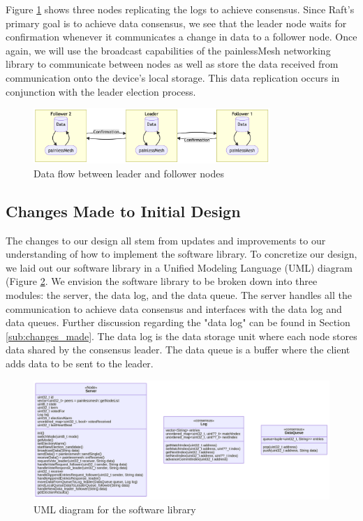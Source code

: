 Figure \ref{fig:data_flow} shows three nodes replicating the logs to achieve consensus. Since Raft's primary goal is to achieve data consensus, we see that the leader node waits for confirmation whenever it communicates a change in data to a follower node. Once again, we will use the broadcast capabilities of the painlessMesh networking library to communicate between nodes as well as store the data received from communication onto the device's local storage. This data replication occurs in conjunction with the leader election process.

\begin{figure}[H]
    \centering
    \includegraphics[width=0.8\textwidth]{images/final_design_data.png}
    \caption{Data flow between leader and follower nodes}
    \label{fig:data_flow}
\end{figure}

\subsection{Changes Made to Initial Design}

The changes to our design all stem from updates and improvements to our understanding of how to implement the software library. To concretize our design, we laid out our software library in a Unified Modeling Language (UML) diagram (Figure \ref{fig:uml}. We envision the software library to be broken down into three modules: the server, the data log, and the data queue. The server handles all the communication to achieve data consensus and interfaces with the data log and data queues. Further discussion regarding the "data log" can be found in Section \ref{sub:changes_made}. The data log is the data storage unit where each node stores data shared by the consensus leader. The data queue is a buffer where the client adds data to be sent to the leader.

\begin{figure}[H]
    \centering
    \includegraphics[width=\textwidth]{images/uml.png}
    \caption{UML diagram for the software library}
    \label{fig:uml}
\end{figure}

